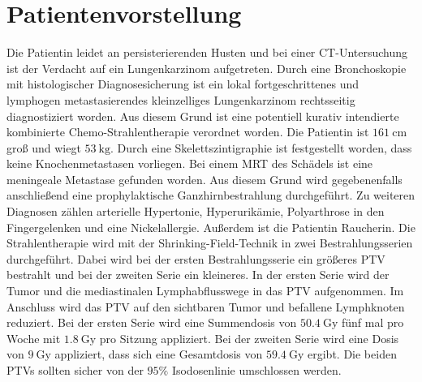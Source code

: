 \section{Patientenvorstellung}

Die Patientin leidet an persisterierenden Husten und bei einer CT-Untersuchung ist der Verdacht auf ein Lungenkarzinom aufgetreten.
Durch eine Bronchoskopie mit histologischer Diagnosesicherung ist ein lokal fortgeschrittenes und
lymphogen metastasierendes kleinzelliges Lungenkarzinom rechtsseitig diagnostiziert worden.
Aus diesem Grund ist eine potentiell kurativ intendierte kombinierte Chemo-Strahlentherapie
verordnet worden. Die Patientin ist $\SI{161}{\centi\meter}$ groß und wiegt $\SI{53}{\kilo\gram}$.
Durch eine Skelettszintigraphie ist festgestellt worden, dass keine Knochenmetastasen vorliegen.
Bei einem MRT des Schädels ist eine meningeale Metastase gefunden worden. Aus diesem Grund wird gegebenenfalls
anschließend eine prophylaktische Ganzhirnbestrahlung durchgeführt.
Zu weiteren Diagnosen zählen arterielle Hypertonie, Hyperurikämie, Polyarthrose in den Fingergelenken und eine Nickelallergie.
Außerdem ist die Patientin Raucherin. Die Strahlentherapie wird mit der Shrinking-Field-Technik in zwei Bestrahlungsserien durchgeführt.
Dabei wird bei der ersten Bestrahlungsserie ein größeres PTV bestrahlt und bei der zweiten Serie ein kleineres.
In der ersten Serie wird der Tumor und die mediastinalen Lymphabflusswege in das PTV aufgenommen. Im Anschluss
wird das PTV auf den sichtbaren Tumor und befallene Lymphknoten reduziert. Bei der ersten Serie wird eine Summendosis von
$\SI{50.4}{\gray}$ fünf mal pro Woche mit $\SI{1.8}{\gray}$ pro Sitzung appliziert. Bei der zweiten Serie wird eine Dosis von $\SI{9}{\gray}$
appliziert, dass sich eine Gesamtdosis von $\SI{59.4}{\gray}$ ergibt. Die beiden PTVs sollten sicher
von der $95\%$ Isodosenlinie umschlossen werden.
